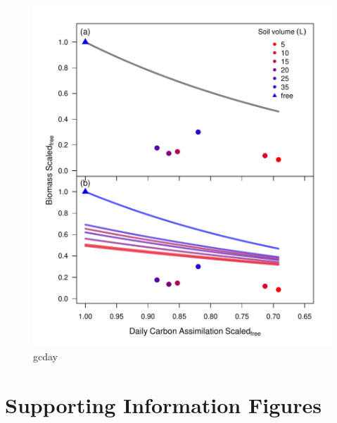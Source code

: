 \documentclass[a4paper]{article}\usepackage[]{graphicx}\usepackage[]{color}
\begin{document}
\begin{figure}[h!]
    \centering
    \includegraphics{gC_day.pdf}
    \caption{gcday}
    \label{fig:figure6}
\end{figure}

\clearpage
\section{Supporting Information Figures}

\renewcommand\thefigure{S\arabic{figure}}    
\setcounter{figure}{0}   
\end{document}
